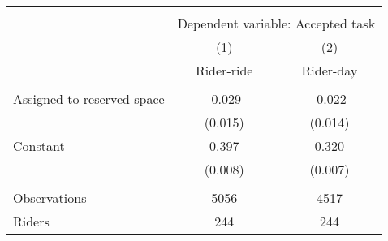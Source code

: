 \begin{tabular}{l*{1}{cc}} \hline\hline \\[-1.8ex] & \multicolumn{2}{c}{Dependent variable: Accepted task} \\
                    &\multicolumn{1}{c}{(1)}&\multicolumn{1}{c}{(2)}\\
                    &\multicolumn{1}{c}{Rider-ride}&\multicolumn{1}{c}{Rider-day}\\
\hline \\[-1.8ex]
Assigned to reserved space&      -0.029\sym{*}  &      -0.022         \\
                    &     (0.015)         &     (0.014)         \\
[1em]
Constant            &       0.397\sym{***}&       0.320\sym{***}\\
                    &     (0.008)         &     (0.007)         \\
\hline \\[-1.8ex]
Observations        &        5056         &        4517         \\
Riders              &         244         &         244         \\
\hline\hline \end{tabular}
